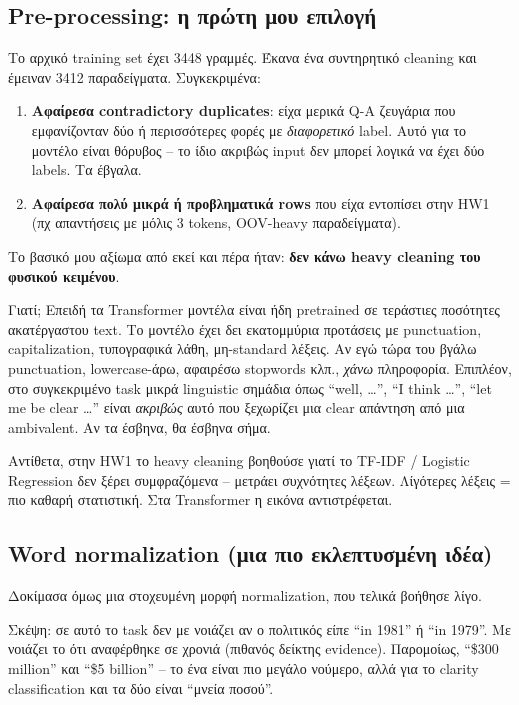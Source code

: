 \documentclass[12pt]{fphw}
\begin{document}
\subsection{Pre-processing: η πρώτη μου επιλογή}

Το αρχικό training set έχει 3448 γραμμές. Έκανα ένα συντηρητικό cleaning και έμειναν 3412 παραδείγματα. Συγκεκριμένα:

\begin{enumerate}
    \item \textbf{Αφαίρεσα contradictory duplicates}: είχα μερικά Q-A ζευγάρια που εμφανίζονταν δύο ή περισσότερες φορές με \emph{διαφορετικό} label. Αυτό για το μοντέλο είναι θόρυβος -- το ίδιο ακριβώς input δεν μπορεί λογικά να έχει δύο labels. Τα έβγαλα.
    \item \textbf{Αφαίρεσα πολύ μικρά ή προβληματικά rows} που είχα εντοπίσει στην HW1 (πχ απαντήσεις με μόλις 3 tokens, OOV-heavy παραδείγματα).
\end{enumerate}

Το βασικό μου αξίωμα από εκεί και πέρα ήταν: \textbf{δεν κάνω heavy cleaning του φυσικού κειμένου}.

Γιατί; Επειδή τα Transformer μοντέλα είναι ήδη pretrained σε τεράστιες ποσότητες ακατέργαστου text. Το μοντέλο έχει δει εκατομμύρια προτάσεις με punctuation, capitalization, τυπογραφικά λάθη, μη-standard λέξεις. Αν εγώ τώρα του βγάλω punctuation, lowercase-άρω, αφαιρέσω stopwords κλπ., \emph{χάνω} πληροφορία. Επιπλέον, στο συγκεκριμένο task μικρά linguistic σημάδια όπως ``well, \dots'', ``I think \dots'', ``let me be clear \dots'' είναι \emph{ακριβώς} αυτό που ξεχωρίζει μια clear απάντηση από μια ambivalent. Αν τα έσβηνα, θα έσβηνα σήμα.

Αντίθετα, στην HW1 το heavy cleaning βοηθούσε γιατί το TF-IDF / Logistic Regression δεν ξέρει συμφραζόμενα -- μετράει συχνότητες λέξεων. Λίγότερες λέξεις = πιο καθαρή στατιστική. Στα Transformer η εικόνα αντιστρέφεται.

\subsection{Word normalization (μια πιο εκλεπτυσμένη ιδέα)}

Δοκίμασα όμως μια στοχευμένη μορφή normalization, που τελικά βοήθησε λίγο.

Σκέψη: σε αυτό το task δεν με νοιάζει αν ο πολιτικός είπε ``in 1981'' ή ``in 1979''. Με νοιάζει το ότι αναφέρθηκε σε χρονιά (πιθανός δείκτης evidence). Παρομοίως, ``\$300 million'' και ``\$5 billion'' -- το ένα είναι πιο μεγάλο νούμερο, αλλά για το clarity classification και τα δύο είναι ``μνεία ποσού''.
\end{document}
